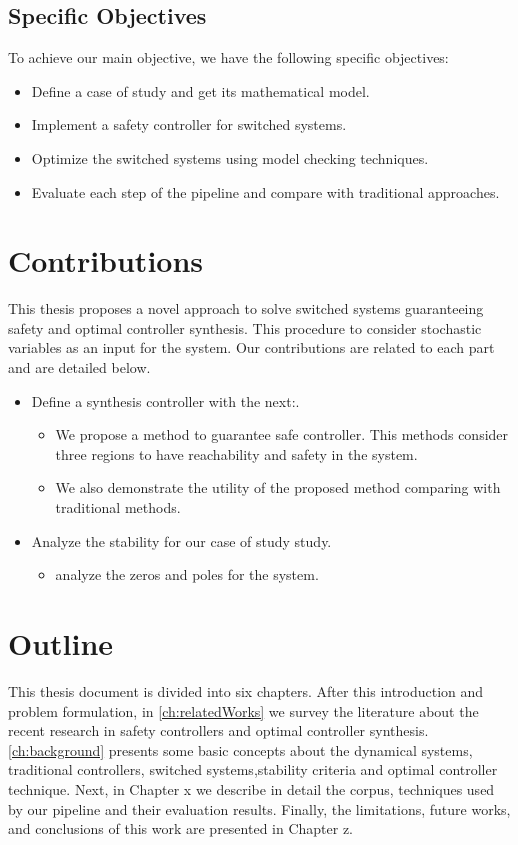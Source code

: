 \subsection*{Specific Objectives}
To achieve our main objective, we have the following specific objectives:
\begin{itemize}
 \item Define a case of study and get its mathematical model.
 \item Implement a safety controller for switched systems.
 \item Optimize the switched systems using model checking techniques.
 \item Evaluate each step of the pipeline and compare with traditional approaches.
\end{itemize}


\section{Contributions}
This thesis proposes a novel approach to solve switched systems guaranteeing safety and optimal controller synthesis. This procedure to consider stochastic variables as an input for the system. Our contributions are related to each part and are detailed below.

\begin{itemize}
 \item Define a synthesis controller with the next:.
 
 \begin{itemize}
  \item We propose a method to guarantee safe controller. This methods consider three regions to have reachability and safety in the system.
  \item We also demonstrate the utility of the proposed method comparing with traditional methods.
 \end{itemize}
 \item Analyze the stability for our case of study study.
 \begin{itemize}
  \item analyze the zeros and poles for the system.
 \end{itemize}
\end{itemize}


\section{Outline}
\label{sec:outline}
This thesis document is divided into six chapters. After this introduction and problem formulation, in \autoref{ch:relatedWorks} we survey the literature about the recent research in safety controllers and optimal controller synthesis. \autoref{ch:background} presents some basic concepts about the dynamical systems, traditional controllers, switched systems,stability criteria and optimal controller technique. Next, in Chapter x we describe in detail the corpus, techniques used by our pipeline and their evaluation results. Finally, the limitations, future works, and conclusions of this work are presented in Chapter z.
